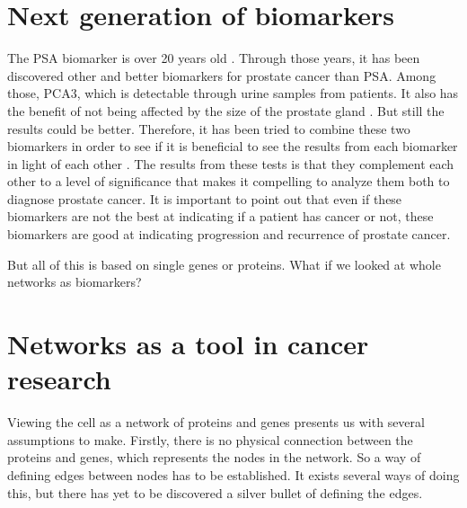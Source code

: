 \documentclass[UKenglish,11pt,a4paper]{article}
\begin{document}
\chapter{Next generation of biomarkers}
The PSA biomarker is over 20 years old \cite{psa-age}. Through those years, it has been discovered other and better
biomarkers for prostate cancer than PSA. Among those, PCA3, which is detectable through urine samples from patients. It
also has the benefit of not being affected by the size of the prostate gland \cite{pca3-size}. But still the results
could be better. Therefore, it has been tried to combine these two biomarkers in order to see if it is beneficial to
see the results from each biomarker in light of each other \cite{beyondpsa}. The results from these tests is that they
complement each other to a level of significance that makes it compelling to analyze them both to diagnose prostate
cancer. It is important to point out that even if these biomarkers are not the best at indicating if a patient has 
cancer or not, these biomarkers are good at indicating progression and recurrence of prostate cancer.

But all of this is based on single genes or proteins. What if we looked at whole networks as biomarkers?

\chapter{Networks as a tool in cancer research}
Viewing the cell as a network of proteins and genes presents us with several assumptions to make. Firstly, there is no
physical connection between the proteins and genes, which represents the nodes in the network. So a way of defining
edges between nodes has to be established. It exists several ways of doing this, but there has yet to be discovered a
silver bullet of defining the edges. %
\end{document}
